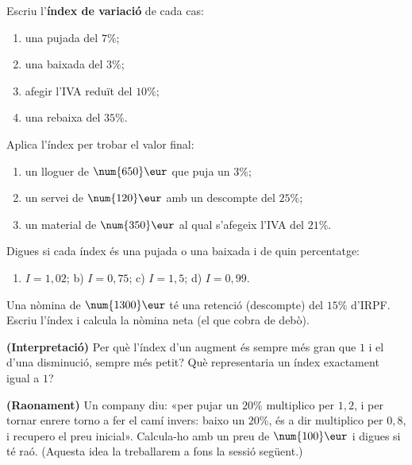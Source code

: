\begin{exercicis}
\begin{exlist}
  \item Escriu l'\textbf{índex de variació} de cada cas:
    \begin{enumerate}[label=\alph*), leftmargin=1.6em, topsep=2pt]
      \item una pujada del $7\%$;
      \item una baixada del $3\%$;
      \item afegir l'IVA reduït del $10\%$;
      \item una rebaixa del $35\%$.
    \end{enumerate}
  \item Aplica l'índex per trobar el valor final:
    \begin{enumerate}[label=\alph*), leftmargin=1.6em, topsep=2pt]
      \item un lloguer de $\num{650}\eur$ que puja un $3\%$;
      \item un servei de $\num{120}\eur$ amb un descompte del $25\%$;
      \item un material de $\num{350}\eur$ al qual s'afegeix l'IVA del $21\%$.
    \end{enumerate}
  \item Digues si cada índex és una pujada o una baixada i de quin percentatge:
    \begin{enumerate}[label=\alph*), leftmargin=1.6em, topsep=2pt]
      \item $I=1,02$; \quad b) $I=0,75$; \quad c) $I=1,5$; \quad d) $I=0,99$.
    \end{enumerate}
  \item Una nòmina de $\num{1300}\eur$ té una retenció (descompte) del $15\%$ d'IRPF.
        Escriu l'índex i calcula la nòmina neta (el que cobra de debò).
  \item \textbf{(Interpretació)} Per què l'índex d'un augment és sempre més gran que
        $1$ i el d'una disminució, sempre més petit? Què representaria un índex
        exactament igual a $1$?
  \item \textbf{(Raonament)} Un company diu: «per pujar un $20\%$ multiplico per $1,2$,
        i per tornar enrere torno a fer el camí invers: baixo un $20\%$, és a dir
        multiplico per $0,8$, i recupero el preu inicial». Calcula-ho amb un preu de
        $\num{100}\eur$ i digues si té raó. (Aquesta idea la treballarem a fons la
        sessió següent.)
\end{exlist}
\end{exercicis}


